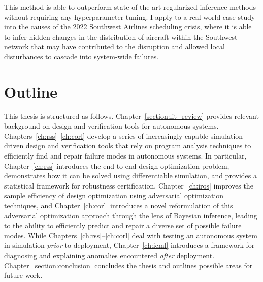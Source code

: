 This method is able to outperform state-of-the-art regularized inference methods without requiring any hyperparameter tuning. I apply \ouralg{} to a real-world case study into the causes of the 2022 Southwest Airlines scheduling crisis, where it is able to infer hidden changes in the distribution of aircraft within the Southwest network that may have contributed to the disruption and allowed local disturbances to cascade into system-wide failures.

\section{Outline}

This thesis is structured as follows. Chapter~\ref{section:lit_review} provides relevant background on design and verification tools for autonomous systems. Chapters~\ref{ch:rss}--\ref{ch:corl} develop a series of increasingly capable simulation-driven design and verification tools that rely on program analysis techniques to efficiently find and repair failure modes in autonomous systems. In particular, Chapter~\ref{ch:rss} introduces the end-to-end design optimization problem, demonstrates how it can be solved using differentiable simulation, and provides a statistical framework for robustness certification, Chapter~\ref{ch:iros} improves the sample efficiency of design optimization using adversarial optimization techniques, and Chapter~\ref{ch:corl} introduces a novel reformulation of this adversarial optimization approach through the lens of Bayesian inference, leading to the ability to efficiently predict and repair a diverse set of possible failure modes. While Chapters~\ref{ch:rss}--\ref{ch:corl} deal with testing an autonomous system in simulation \textit{prior} to deployment, Chapter~\ref{ch:icml} introduces a framework for diagnosing and explaining anomalies encountered \textit{after} deployment. Chapter~\ref{section:conclusion} concludes the thesis and outlines possible areas for future work.